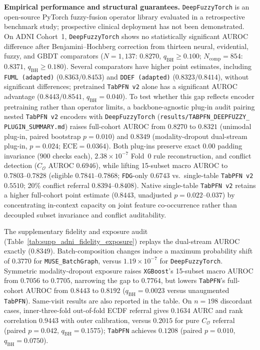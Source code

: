 \documentclass[10pt,twocolumn]{article}
\begin{document}
\noindent\textbf{Empirical performance and structural guarantees.}
\texttt{DeepFuzzyTorch} is an open-source PyTorch fuzzy-fusion operator library evaluated in a
retrospective benchmark study; prospective clinical deployment has not been demonstrated.
On ADNI Cohort~1, \texttt{DeepFuzzyTorch} shows no statistically significant AUROC difference
after Benjamini--Hochberg correction from thirteen neural, evidential, fuzzy, and GBDT
comparators ($N=1,137$: $0.8270$, $q_{\text{BH}}\ge0.100$; $N_{\text{comp}}=854$: $0.8371$,
$q_{\text{BH}}\ge0.180$). Several comparators have higher point estimates, including
\texttt{FUML (adapted)} ($0.8363/0.8453$) and \texttt{DDEF (adapted)} ($0.8323/0.8414$),
without significant differences; pretrained \texttt{TabPFN~v2} alone has a significant AUROC
advantage ($0.8443/0.8541$, $q_{\text{BH}}=0.040$).
To test whether this gap reflects encoder pretraining rather than operator limits, a
backbone-agnostic plug-in audit pairing nested \texttt{TabPFN~v2} encoders with
\texttt{DeepFuzzyTorch} (\texttt{results/\allowbreak TABPFN\_\allowbreak DEEPFUZZY\_\allowbreak
PLUGIN\_\allowbreak SUMMARY.md}) raises full-cohort AUROC from $0.8270$ to $0.8321$
(unimodal plug-in, paired bootstrap $p=0.010$) and $0.8349$ (modality-dropout dual-stream
plug-in, $p=0.024$; $\text{ECE}=0.0364$). Both plug-ins preserve exact $0.00$ padding
invariance ($900$ checks each), $2.38\times 10^{-7}$ Fold~0 rule reconstruction, and conflict
detection ($C_{\mathcal{O}}$ AUROC $0.6946$), while lifting 15-subset macro AUROC to
$0.7803\text{--}0.7828$ (eligible $0.7841\text{--}0.7868$; \texttt{FDG}-only $0.6743$ vs.\
single-table \texttt{TabPFN~v2} $0.5510$; 20\% conflict referral $0.8394\text{--}0.8408$).
Native single-table \texttt{TabPFN~v2} retains a higher full-cohort point estimate ($0.8443$,
unadjusted $p=0.022\text{--}0.037$) by concentrating in-context capacity on joint feature
co-occurrence rather than decoupled subset invariance and conflict auditability.

The supplementary fidelity and exposure audit (Table~\ref{tab:supp_adni_fidelity_exposure})
replays the dual-stream AUROC exactly ($0.8349$). Batch-composition changes induce a maximum
probability shift of $0.3770$ for \texttt{MUSE\_BatchGraph}, versus $1.19\times10^{-7}$ for
\texttt{DeepFuzzyTorch}. Symmetric modality-dropout exposure raises \texttt{XGBoost}'s
15-subset macro AUROC from $0.7056$ to $0.7705$, narrowing the gap to $0.7764$, but lowers
\texttt{TabPFN}'s full-cohort AUROC from $0.8443$ to $0.8192$ ($q_{\mathrm{BH}}=0.0023$
versus unaugmented \texttt{TabPFN}). Same-visit results are also reported in the table. On
$n=198$ discordant cases, inner-three-fold out-of-fold ECDF referral gives $0.1634$ AURC and
rank correlation $0.9443$ with outer calibration, versus $0.2015$ for pure $C_{\mathcal O}$
referral (paired $p=0.042$, $q_{\mathrm{BH}}=0.1575$); \texttt{TabPFN} achieves $0.1208$
(paired $p=0.010$, $q_{\mathrm{BH}}=0.0750$).
\end{document}
